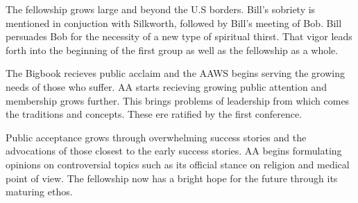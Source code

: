 
\bbChapterPreamble

    The fellowship grows large and beyond the U.S borders. Bill's sobriety is mentioned in conjuction with Silkworth, followed by Bill's meeting of Bob. Bill persuades Bob for the necessity of a new type of spiritual thirst. That vigor leads forth into the beginning of the first group as well as the fellowship as a whole. 

    The Bigbook recieves public acclaim and the AAWS begins serving the growing needs of those who suffer. AA starts recieving growing public attention and membership grows further. This brings problems of leadership from which comes the traditions and concepts. These ere ratified by the first conference.

    Public acceptance grows through overwhelming success stories and the advocations of those closest to the early success stories. AA begins formulating opinions on controversial topics such as its official stance on religion and medical point of view. The fellowship now has a bright hope for the future through its maturing ethos.


